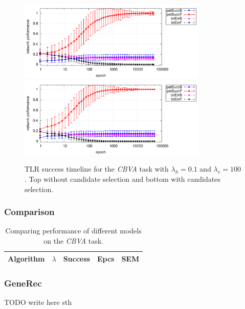 \begin{figure}[H]
  \centering
  \includegraphics[width=0.8\textwidth]{img/tlr-k3-3-best-perf.pdf}   
  \includegraphics[width=0.8\textwidth]{img/tlr-k3-3-best-can.pdf}      
  \caption{TLR success timeline for the \emph{CBVA} task with $\lambda_h=0.1$ and $\lambda_v=100$. Top without candidate selection and bottom with candidates selection. }
  \label{fig:results-tlr-k3-epoch} 
\end{figure}

\subsubsection{Comparison} 
\label{sec:results-cmp-k3} 


\begin{table}
  \centering
    \begin{tabular}{|l|l|l|l|l|}
    \hline
    Algorithm&$\lambda$&Success&Epcs&SEM \\
    \hline
    \end{tabular}
  \caption{Comparing performance of different models on the \emph{CBVA} task.} 
  \label{tab:results-cmp-k3}
\end{table}


\subsubsection{GeneRec} 
TODO write here sth

